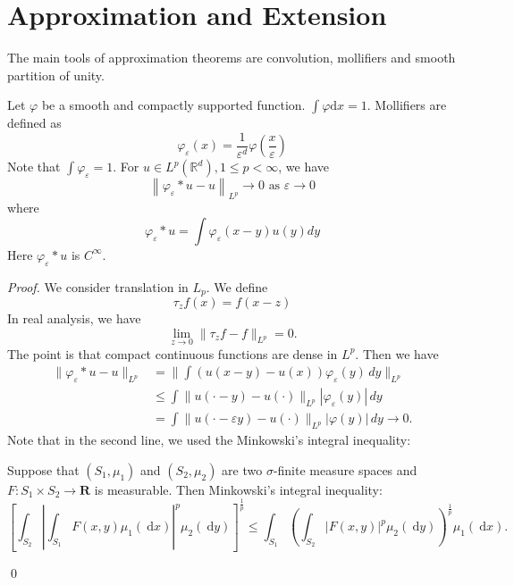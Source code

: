 \newpage
\section{Approximation and Extension}

The main tools of approximation theorems are convolution, mollifiers and smooth partition of unity.

\begin{lemma}
[Mollifiers]
Let $\varphi$ be a smooth and compactly supported function. $\int \varphi \mathrm{d} x=1 .$ Mollifiers are defined as
$$
\varphi_{\varepsilon}(x)=\frac{1}{\varepsilon^{d}} \varphi\left(\frac{x}{\varepsilon}\right)
$$
Note that $\int \varphi_{\varepsilon}=1$. For $u \in L^{p}\left(\mathbb{R}^{d}\right), 1 \leq p<\infty$, we have
$$
\left\|\varphi_{\varepsilon} * u-u\right\|_{L^{p}} \rightarrow 0 \text { as } \varepsilon \rightarrow 0
$$
where
$$
\varphi_{\varepsilon} * u=\int \varphi_{\varepsilon}(x-y) u(y) d y
$$
Here $\varphi_{\varepsilon} * u$ is $C^{\infty}$.
\end{lemma}
\begin{proof}
We consider translation in $L_p$. We define 
\[
    \tau_z f(x) = f(x-z)
\]
In real analysis, we have 
\[
    \lim_{z\to 0} \|\tau_z f - f\|_{L^p}= 0.
\]
The point is that compact continuous functions are dense in $L^p$. Then we have 
\begin{align*}
    \|\varphi_{\varepsilon} * u  - u \|_{L^p} &= \| \int (u(x-y) - u(x))\varphi_\varepsilon(y)\, dy \|_{L^p}\\ 
    & \le \int \|u(\cdot - y) - u(\cdot)\|_{L^p} |\varphi_\varepsilon (y)| \, dy \\ 
    & = \int \|u(\cdot - \varepsilon y) - u(\cdot) \|_{L^p} |\varphi (y)| \, dy  \to 0.
\end{align*}
Note that in the second line, we used the Minkowski's integral inequality: 

\begin{lemma}
Suppose that $\left(S_{1}, \mu_{1}\right)$ and $\left(S_{2}, \mu_{2}\right)$ are two $\sigma$-finite measure spaces and $F: S_{1} \times S_{2} \rightarrow \mathbf{R}$ is measurable. Then Minkowski's integral inequality:
$$
\left[\int_{S_{2}}\left|\int_{S_{1}} F(x, y) \mu_{1}(\mathrm{~d} x)\right|^{p} \mu_{2}(\mathrm{~d} y)\right]^{\frac{1}{p}} \leq \int_{S_{1}}\left(\int_{S_{2}}|F(x, y)|^{p} \mu_{2}(\mathrm{~d} y)\right)^{\frac{1}{p}} \mu_{1}(\mathrm{~d} x).
$$
\end{lemma}
\qed 
\end{proof}

